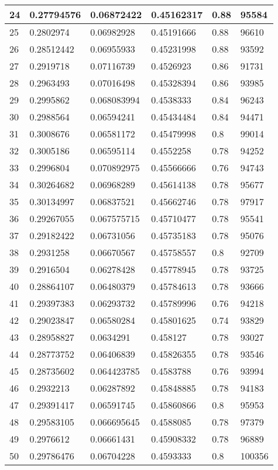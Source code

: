 \begin{longtable}{|l|l|l|l|l|l|}
24 & 0.27794576 & 0.06872422 & 0.45162317 & 0.88 & 95584 \\ \hline 
25 & 0.2802974 & 0.06982928 & 0.45191666 & 0.88 & 96610 \\ \hline 
26 & 0.28512442 & 0.06955933 & 0.45231998 & 0.88 & 93592 \\ \hline 
27 & 0.2919718 & 0.07116739 & 0.4526923 & 0.86 & 91731 \\ \hline 
28 & 0.2963493 & 0.07016498 & 0.45328394 & 0.86 & 93985 \\ \hline 
29 & 0.2995862 & 0.068083994 & 0.4538333 & 0.84 & 96243 \\ \hline 
30 & 0.2988564 & 0.06594241 & 0.45434484 & 0.84 & 94471 \\ \hline 
31 & 0.3008676 & 0.06581172 & 0.45479998 & 0.8 & 99014 \\ \hline 
32 & 0.3005186 & 0.06595114 & 0.4552258 & 0.78 & 94252 \\ \hline 
33 & 0.2996804 & 0.070892975 & 0.45566666 & 0.76 & 94743 \\ \hline 
34 & 0.30264682 & 0.06968289 & 0.45614138 & 0.78 & 95677 \\ \hline 
35 & 0.30134997 & 0.06837521 & 0.45662746 & 0.78 & 97917 \\ \hline 
36 & 0.29267055 & 0.067575715 & 0.45710477 & 0.78 & 95541 \\ \hline 
37 & 0.29182422 & 0.06731056 & 0.45735183 & 0.78 & 95076 \\ \hline 
38 & 0.2931258 & 0.06670567 & 0.45758557 & 0.8 & 92709 \\ \hline 
39 & 0.2916504 & 0.06278428 & 0.45778945 & 0.78 & 93725 \\ \hline 
40 & 0.28864107 & 0.06480379 & 0.45784613 & 0.78 & 93666 \\ \hline 
41 & 0.29397383 & 0.06293732 & 0.45789996 & 0.76 & 94218 \\ \hline 
42 & 0.29023847 & 0.06580284 & 0.45801625 & 0.74 & 93829 \\ \hline 
43 & 0.28958827 & 0.0634291 & 0.458127 & 0.78 & 93027 \\ \hline 
44 & 0.28773752 & 0.06406839 & 0.45826355 & 0.78 & 93546 \\ \hline 
45 & 0.28735602 & 0.064423785 & 0.4583788 & 0.76 & 93994 \\ \hline 
46 & 0.2932213 & 0.06287892 & 0.45848885 & 0.78 & 94183 \\ \hline 
47 & 0.29391417 & 0.06591745 & 0.45860866 & 0.8 & 95953 \\ \hline 
48 & 0.29583105 & 0.066695645 & 0.4588085 & 0.78 & 97379 \\ \hline 
49 & 0.2976612 & 0.06661431 & 0.45908332 & 0.78 & 96889 \\ \hline 
50 & 0.29786476 & 0.06704228 & 0.4593333 & 0.8 & 100356 \\ \hline 
\end{longtable}